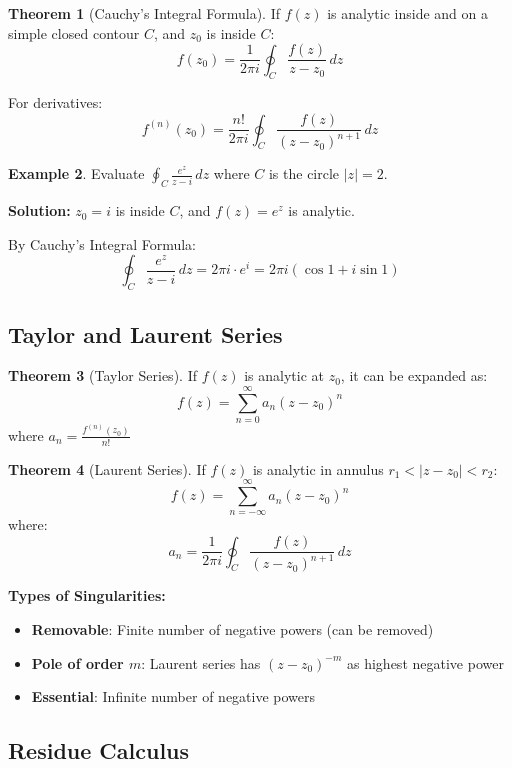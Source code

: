 \documentclass[12pt,a4paper]{article}
\theoremstyle{definition}
\newtheorem{theorem}{Theorem}[section]
\newtheorem{example}[theorem]{Example}
\begin{document}
\begin{theorem}[Cauchy's Integral Formula]
If $f(z)$ is analytic inside and on a simple closed contour $C$, and $z_0$ is inside $C$:
\[
f(z_0) = \frac{1}{2\pi i}\oint_C \frac{f(z)}{z - z_0}\,dz
\]

For derivatives:
\[
f^{(n)}(z_0) = \frac{n!}{2\pi i}\oint_C \frac{f(z)}{(z - z_0)^{n+1}}\,dz
\]
\end{theorem}

\begin{example}
Evaluate $\oint_C \frac{e^z}{z - i}\,dz$ where $C$ is the circle $|z| = 2$.

\textbf{Solution:}
$z_0 = i$ is inside $C$, and $f(z) = e^z$ is analytic.

By Cauchy's Integral Formula:
\[
\oint_C \frac{e^z}{z - i}\,dz = 2\pi i \cdot e^i = 2\pi i(\cos 1 + i\sin 1)
\]
\end{example}

\subsection{Taylor and Laurent Series}

\begin{theorem}[Taylor Series]
If $f(z)$ is analytic at $z_0$, it can be expanded as:
\[
f(z) = \sum_{n=0}^{\infty} a_n(z - z_0)^n
\]
where $a_n = \frac{f^{(n)}(z_0)}{n!}$
\end{theorem}

\begin{theorem}[Laurent Series]
If $f(z)$ is analytic in annulus $r_1 < |z - z_0| < r_2$:
\[
f(z) = \sum_{n=-\infty}^{\infty} a_n(z - z_0)^n
\]
where:
\[
a_n = \frac{1}{2\pi i}\oint_C \frac{f(z)}{(z - z_0)^{n+1}}\,dz
\]
\end{theorem}

\begin{importantbox}
\textbf{Types of Singularities:}
\begin{itemize}
    \item \textbf{Removable}: Finite number of negative powers (can be removed)
    \item \textbf{Pole of order $m$}: Laurent series has $(z-z_0)^{-m}$ as highest negative power
    \item \textbf{Essential}: Infinite number of negative powers
\end{itemize}
\end{importantbox}

\subsection{Residue Calculus}
\end{document}

